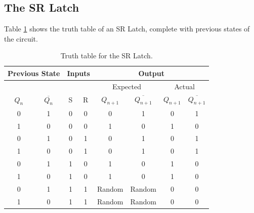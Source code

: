\documentclass{report}
\begin{document}
	\subsection{The SR Latch}
	Table \ref{section5} shows the truth table of an SR Latch, complete with previous states of the circuit.
	\begin{table}[h]
		\centering
		\begin{tabular}{@{}cc|cc|cccc@{}}
			\toprule
			\multicolumn{2}{c|}{Previous State}                 & \multicolumn{2}{c|}{Inputs}                         & \multicolumn{4}{c}{Output}                                                     \\ \midrule
			\cellcolor[HTML]{000000} & \cellcolor[HTML]{000000} & \cellcolor[HTML]{000000} & \cellcolor[HTML]{000000} & \multicolumn{2}{c|}{Expected}                    & \multicolumn{2}{c}{Actual}  \\ \midrule
			$Q_{n}$                        & $\overline{Q_{n}}$                    & S                        & R                        & $Q_{n+1}$ & \multicolumn{1}{c|}{$\overline{Q_{n+1}}$} & $Q_{n+1}$ & $\overline{Q_{n+1}}$ \\ \midrule
			0                        & 1                        & 0                        & 0                        & 0          & \multicolumn{1}{c|}{1}              & 0          & 1              \\
			1                        & 0                        & 0                        & 0                        & 1          & \multicolumn{1}{c|}{0}              & 1          & 0              \\
			0                        & 1                        & 0                        & 1                        & 0          & \multicolumn{1}{c|}{1}              & 0          & 1              \\
			1                        & 0                        & 0                        & 1                        & 0          & \multicolumn{1}{c|}{1}              & 0          & 1              \\
			0                        & 1                        & 1                        & 0                        & 1          & \multicolumn{1}{c|}{0}              & 1          & 0              \\
			1                        & 0                        & 1                        & 0                        & 1          & \multicolumn{1}{c|}{0}              & 1          & 0              \\
			0                        & 1                        & 1                        & 1                        & Random     & \multicolumn{1}{c|}{Random}         & 0          & 0              \\
			1                        & 0                        & 1                        & 1                        & Random     & \multicolumn{1}{c|}{Random}         & 0          & 0              \\ \bottomrule
		\end{tabular}
		\caption{Truth table for the SR Latch.}
		\label{section5}
	\end{table}
	
\end{document}
